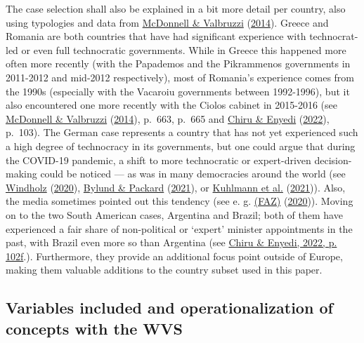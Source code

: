 \documentclass[
  12pt,
  english,
]{article}
\begin{document}
The case selection shall also be explained in a bit more detail per
country, also using typologies and data from
\protect\hyperlink{ref-mcdonnell2014defining}{McDonnell \& Valbruzzi}
(\protect\hyperlink{ref-mcdonnell2014defining}{2014}). Greece and
Romania are both countries that have had significant experience with
technocrat-led or even full technocratic governments. While in Greece
this happened more often more recently (with the Papademos and the
Pikrammenos governments in 2011-2012 and mid-2012 respectively), most of
Romania's experience comes from the 1990s (especially with the Vacaroiu
governments between 1992-1996), but it also encountered one more
recently with the Ciolos cabinet in 2015-2016 (see
\protect\hyperlink{ref-mcdonnell2014defining}{McDonnell \& Valbruzzi}
(\protect\hyperlink{ref-mcdonnell2014defining}{2014}), p.~663, p.~665
and \protect\hyperlink{ref-chiru2022wants}{Chiru \& Enyedi}
(\protect\hyperlink{ref-chiru2022wants}{2022}), p.~103). The German case
represents a country that has not yet experienced such a high degree of
technocracy in its governments, but one could argue that during the
COVID-19 pandemic, a shift to more technocratic or expert-driven
decision-making could be noticed --- as was in many democracies around
the world (see \protect\hyperlink{ref-windholz2020governing}{Windholz}
(\protect\hyperlink{ref-windholz2020governing}{2020}),
\protect\hyperlink{ref-bylund2021separation}{Bylund \& Packard}
(\protect\hyperlink{ref-bylund2021separation}{2021}), or
\protect\hyperlink{ref-kuhlmann2021tracing}{Kuhlmann et al.}
(\protect\hyperlink{ref-kuhlmann2021tracing}{2021})). Also, the media
sometimes pointed out this tendency (see e. g.
\protect\hyperlink{ref-FAZ2020virologen}{(FAZ)}
(\protect\hyperlink{ref-FAZ2020virologen}{2020})). Moving on to the two
South American cases, Argentina and Brazil; both of them have
experienced a fair share of non-political or `expert' minister
appointments in the past, with Brazil even more so than Argentina (see
\protect\hyperlink{ref-chiru2022wants}{Chiru \& Enyedi, 2022, p.
102f}.). Furthermore, they provide an additional focus point outside of
Europe, making them valuable additions to the country subset used in
this paper.

\hypertarget{variables-included-and-operationalization-of-concepts-with-the-wvs}{%
\subsection{Variables included and operationalization of concepts with
the
WVS}\label{variables-included-and-operationalization-of-concepts-with-the-wvs}}
\end{document}
